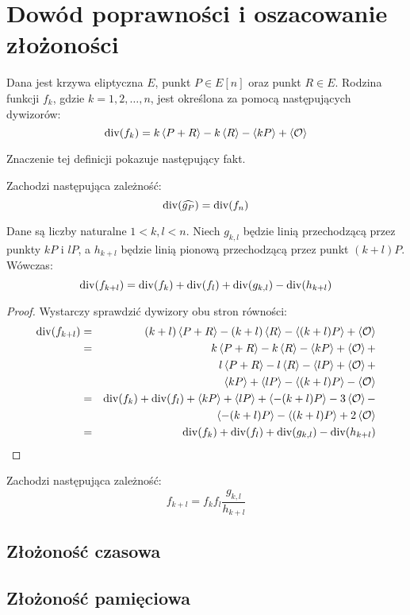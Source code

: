 \section{Dowód poprawności i oszacowanie złożoności}

\begin{definition}
Dana jest krzywa eliptyczna $E$,
punkt $P \in E[n]$ oraz punkt $R \in E$.
Rodzina funkcji $f_k$, gdzie $k = 1, 2, \ldots, n$,
jest określona za pomocą następujących dywizorów:
\begin{equation}
\operatorname{div}(f_k) = k\left\langle P+R\right\rangle - k\left\langle R\right\rangle - \left\langle kP\right\rangle + \left\langle\mathcal{O}\right\rangle
\end{equation}
\end{definition}

Znaczenie tej definicji pokazuje następujący fakt.

\begin{fact}
Zachodzi następująca zależność:
\begin{equation}
\operatorname{div}(\widehat{g_P}) = \operatorname{div}(f_n)
\end{equation}
\end{fact}

\begin{lemma}
Dane są liczby naturalne $1 < k,l < n$.
Niech $g_{k,l}$ będzie linią przechodzącą przez punkty $kP$ i $lP$,
a $h_{k+l}$ będzie linią pionową przechodzącą przez punkt $(k+l)P$.
Wówczas:
\begin{equation}
\operatorname{div}(f_{k+l}) = \operatorname{div}(f_k) + \operatorname{div}(f_l) + \operatorname{div}(g_{k,l}) - \operatorname{div}(h_{k+l})
\end{equation}
\end{lemma}

\begin{proof}
Wystarczy sprawdzić dywizory obu stron równości:
\begin{eqnarray*}
\operatorname{div}(f_{k+l})
& = & (k+l)\left\langle P+R\right\rangle - (k+l)\left\langle R\right\rangle - \left\langle(k+l)P\right\rangle + \left\langle\mathcal{O}\right\rangle \\
& = & k\left\langle P+R\right\rangle - k\left\langle R\right\rangle - \left\langle kP\right\rangle + \left\langle\mathcal{O}\right\rangle + \\
&   & l\left\langle P+R\right\rangle - l\left\langle R\right\rangle - \left\langle lP\right\rangle + \left\langle\mathcal{O}\right\rangle + \\
&   & \left\langle kP\right\rangle + \left\langle lP\right\rangle - \left\langle(k+l)P\right\rangle - \left\langle\mathcal{O}\right\rangle \\
& = & \operatorname{div}(f_k) + \operatorname{div}(f_l) +
      \left\langle kP\right\rangle + \left\langle lP\right\rangle + \left\langle-(k+l)P\right\rangle - 3\left\langle\mathcal{O}\right\rangle - \\
&   & \left\langle-(k+l)P\right\rangle - \left\langle(k+l)P\right\rangle + 2\left\langle\mathcal{O}\right\rangle \\
& = & \operatorname{div}(f_k) + \operatorname{div}(f_l) + \operatorname{div}(g_{k,l}) - \operatorname{div}(h_{k+l})
\end{eqnarray*}
\end{proof}

\begin{corollary}
Zachodzi następująca zależność:
\begin{equation}
f_{k+l} = f_k f_l \frac{g_{k,l}}{h_{k+l}}
\end{equation}
\end{corollary}

\subsection*{Złożoność czasowa}


\subsection*{Złożoność pamięciowa}

